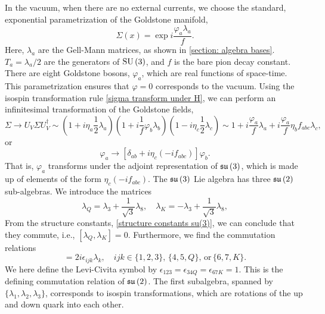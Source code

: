 %
In the vacuum, when there are no external currents, we choose the standard, exponential parametrization of the Goldstone manifold,
%
\begin{equation}
    \Sigma(x) = \exp{i\frac{\varphi_a \lambda_a}{f}}.
\end{equation}
%
Here, $\lambda_a$ are the Gell-Mann matrices, as shown in \autoref{section: algebra bases}.
$T_a = \lambda_a / 2$ are the generators of $\text{SU}\left(3\right)$, and $f$ is the bare pion decay constant.
There are eight Goldstone bosons, $\varphi_a$, which are real functions of space-time.
This parametrization ensures that $\varphi = 0$ corresponds to the vacuum.
Using the isospin transformation rule \autoref{sigma transform under H}, we can perform an infinitesimal transformation of the Goldstone fields,
%
\begin{equation}
    \Sigma \rightarrow U_V \Sigma U_V^\dagger
    \sim
    \left(1 + i \eta_a \frac{1}{2} \lambda_a\right)
    \left(1 + i \frac{1}{f} \varphi_b  \lambda_b\right)
    \left(1 - i \eta_c \frac{1}{2} \lambda_c\right)
    \sim
    1 + i\frac{\varphi_a}{f} \lambda_a + i \frac{\varphi_a}{f} \eta_b f_{abc} \lambda_c,
\end{equation}
%
or
%
\begin{equation}
    \varphi_a \rightarrow [\delta_{ab} + i\eta_c (-if_{abc})] \varphi_b.
\end{equation}
%
That is, $\varphi_a$ transforms under the adjoint representation of $\mathfrak{su}\left(3\right)$, which is made up of elements of the form $\eta_c (-i f_{abc})$.
The $\mathfrak{su}\left(3\right)$ Lie algebra has three $\mathfrak{su}\left(2\right)$ sub-algebras.
We introduce the matrices
%
\begin{equation}
    \lambda_Q = \lambda_3 + \frac{1}{\sqrt{3}}\lambda_8, \quad
    \lambda_K = -\lambda_3 + \frac{1}{\sqrt{3}}\lambda_8,
\end{equation}
%
From the structure constants, \autoref{structure constants su(3)}, we can conclude that they commute, i.e., $[\lambda_Q, \lambda_K] = 0$.
Furthermore, we find the commutation relations
%
\begin{equation}
    [\lambda_i, \lambda_j] = 2i \epsilon_{ijk} \lambda_k,\quad
    ijk \in \{1, 2, 3\}, \, \{4, 5, Q\}, \, \text{or} \, \{6, 7, K\}.
\end{equation}
%
We here define the Levi-Civita symbol by $\epsilon_{123} = \epsilon_{34Q} =\epsilon_{67K} = 1$.
This is the defining commutation relation of $\mathfrak{su}\left(2\right)$.
The first subalgebra, spanned by $\{ \lambda_1, \lambda_2, \lambda_3 \}$, corresponds to isospin transformations, which are rotations of the up and down quark into each other.
